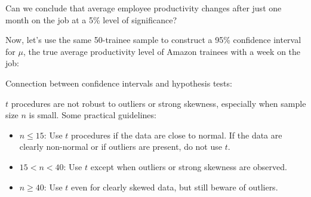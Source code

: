 \documentclass[11pt,letterpaper,twoside]{article}
\begin{document}
Can we conclude that average employee productivity changes after just one month on the job at a 5\% level of significance? \vspace{250pt}

Now, let’s use the same 50-trainee sample to construct a 95\% confidence interval for $\mu$, the true average productivity level of Amazon trainees with a week on the job: \vspace{80pt}

Connection between confidence intervals and hypothesis tests:

\newpage

$t$ procedures are not robust to outliers or strong skewness, especially when sample size $n$ is small.  Some practical guidelines:

\begin{itemize}

\item $n \leq 15$: Use $t$ procedures if the data are close to normal. If the data are clearly non-normal or if outliers are present, do not use $t$.

\item $15 < n < 40$: Use $t$ except when outliers or strong skewness are observed.

\item $n \geq 40$: Use $t$ even for clearly skewed data, but still beware of outliers.

\end{itemize}

\label{totalpag}
\end{document}

